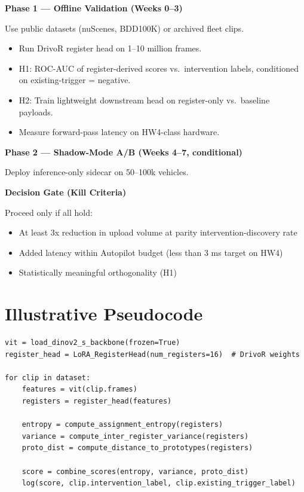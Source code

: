 \documentclass[11pt]{article}
\begin{document}
\textbf{Phase 1 --- Offline Validation (Weeks 0--3)}

Use public datasets (nuScenes, BDD100K) or archived fleet clips.

\begin{itemize}
  \item Run DrivoR register head on 1--10 million frames.
  \item H1: ROC-AUC of register-derived scores vs.\ intervention labels, conditioned on existing-trigger = negative.
  \item H2: Train lightweight downstream head on register-only vs.\ baseline payloads.
  \item Measure forward-pass latency on HW4-class hardware.
\end{itemize}

\textbf{Phase 2 --- Shadow-Mode A/B (Weeks 4--7, conditional)}

Deploy inference-only sidecar on 50--100k vehicles.

\textbf{Decision Gate (Kill Criteria)}

Proceed only if all hold:

\begin{itemize}
  \item At least 3x reduction in upload volume at parity intervention-discovery rate
  \item Added latency within Autopilot budget (less than 3 ms target on HW4)
  \item Statistically meaningful orthogonality (H1)
\end{itemize}

\section{Illustrative Pseudocode}

\begin{lstlisting}[style=sidecarcode, caption={Inference-only register-token sidecar workflow.}, label={lst:sidecar}]
vit = load_dinov2_s_backbone(frozen=True)
register_head = LoRA_RegisterHead(num_registers=16)  # DrivoR weights

for clip in dataset:
    features = vit(clip.frames)
    registers = register_head(features)

    entropy = compute_assignment_entropy(registers)
    variance = compute_inter_register_variance(registers)
    proto_dist = compute_distance_to_prototypes(registers)

    score = combine_scores(entropy, variance, proto_dist)
    log(score, clip.intervention_label, clip.existing_trigger_label)
\end{lstlisting}
\end{document}
